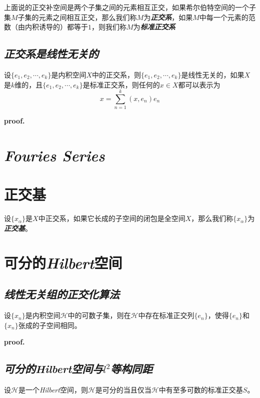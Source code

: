 上面说的正交补空间是两个子集之间的元素相互正交，如果希尔伯特空间的一个子集$M$子集的元素之间相互正交，那么我们称$M$为\textbf{\textsl{正交系}}，如果$M$中每一个元素的范数（由内积诱导的）都等于$1$，则我们称$M$为\textbf{\textsl{标准正交系}}

\subsection*{\textsl{正交系是线性无关的}}

\begin{mdframed}
    \begin{theorem}
        设$\{e_1,e_2,\cdots,e_k\}$是内积空间$X$中的正交系，则$\{e_1,e_2,\cdots,e_k\}$是线性无关的，如果$X$是$k$维的，且$\{e_1,e_2,\cdots,e_k\}$是标准正交系，则任何的$x\in X$都可以表示为
        \begin{equation}
            x=\sum\limits_{n=1}^{k}(x,e_n)e_n
        \end{equation}
    \end{theorem}
\end{mdframed}

\textbf{proof.}

\section{\textsl{Fouries Series}}

\section{正交基}

设$\{x_\alpha\}$是$X$中正交系，如果它长成的子空间的闭包是全空间$X$，那么我们称$\{x_\alpha\}$为\textbf{\textsl{正交基}}。

\section{可分的\textsl{Hilbert}空间}

\subsection*{\textsl{线性无关组的正交化算法}}

\begin{mdframed}
    \begin{theorem}
        设$\{x_n\}$是内积空间$\mathcal{H}$中的可数子集，则在$\mathcal{H}$中存在标准正交列$\{e_n\}$，使得$\{e_n\}$和$\{x_n\}$张成的子空间相同。
    \end{theorem}
\end{mdframed}

\textbf{proof.}

\subsection*{\textsl{可分的\textsl{Hilbert}空间与$l^2$等构同距}}
\begin{mdframed}
    \begin{theorem}
        设$\mathcal{H}$是一个\textsl{Hilbert}空间，则$\mathcal{H}$是可分的当且仅当$\mathcal{H}$中有至多可数的标准正交基$S$。
    \end{theorem}
\end{mdframed}